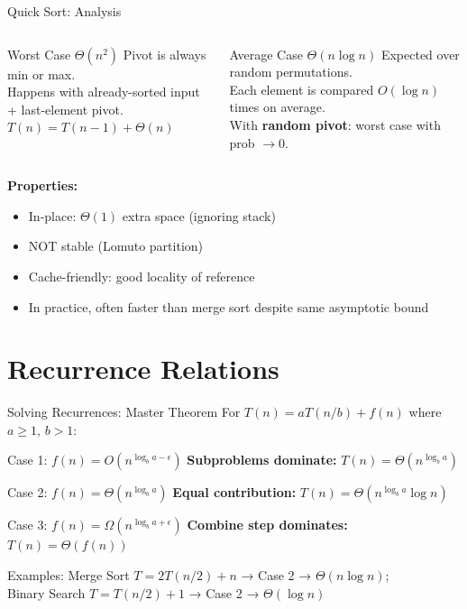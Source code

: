 \documentclass[aspectratio=169,xcolor=dvipsnames]{beamer}
\begin{document}
\begin{frame}{Quick Sort: Analysis}
  \begin{columns}
    \begin{alertblock}{Worst Case $\Theta(n^2)$}
      Pivot is always min or max.\\
      Happens with already-sorted input + last-element pivot.\\
      $T(n) = T(n-1) + \Theta(n)$
    \end{alertblock}
    \begin{exampleblock}{Average Case $\Theta(n\log n)$}
      Expected over random permutations.\\
      Each element is compared $O(\log n)$ times on average.\\
      With \textbf{random pivot}: worst case with prob $\to 0$.
    \end{exampleblock}
  \end{columns}
  \vspace{0.5em}
  \textbf{Properties:}
  \begin{itemize}
    \item In-place: $\Theta(1)$ extra space (ignoring stack)
    \item NOT stable (Lomuto partition)
    \item Cache-friendly: good locality of reference
    \item In practice, often faster than merge sort despite same asymptotic bound
  \end{itemize}
\end{frame}

\section{Recurrence Relations}
\begin{frame}{Solving Recurrences: Master Theorem}
  For $T(n) = aT(n/b) + f(n)$ where $a \ge 1,\, b > 1$:
  \begin{block}{Case 1: $f(n) = O(n^{\log_b a - \epsilon})$}
    \textbf{Subproblems dominate:} $T(n) = \Theta(n^{\log_b a})$
  \end{block}
  \begin{block}{Case 2: $f(n) = \Theta(n^{\log_b a})$}
    \textbf{Equal contribution:} $T(n) = \Theta(n^{\log_b a} \log n)$
  \end{block}
  \begin{block}{Case 3: $f(n) = \Omega(n^{\log_b a + \epsilon})$}
    \textbf{Combine step dominates:} $T(n) = \Theta(f(n))$
  \end{block}
  \vspace{0.3em}
  Examples: Merge Sort $T=2T(n/2)+n$ → Case 2 → $\Theta(n\log n)$;\\
  Binary Search $T=T(n/2)+1$ → Case 2 → $\Theta(\log n)$
\end{frame}
\end{document}
